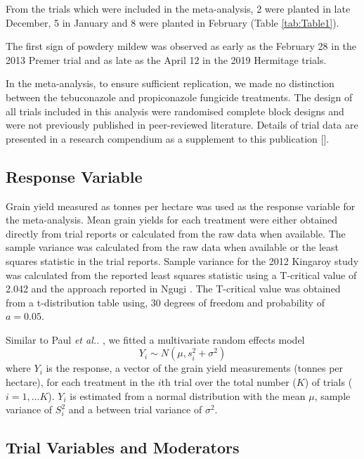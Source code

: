\documentclass[agronomy,article,submit,moreauthors,pdftex]{mdpi}
\begin{document}
From the trials which were included in the meta-analysis, 2 were planted in late December, 5 in January and 8 were planted in February (Table \ref{tab:Table1}).

The first sign of powdery mildew was observed as early as the February 28 in the 2013 Premer trial and as late as the April 12 in the 2019 Hermitage trials.

In the meta-analysis, to ensure sufficient replication, we made no distinction between the tebuconazole and propiconazole fungicide treatments.
The design of all trials included in this analysis were randomised complete block designs and were not previously published in peer-reviewed literature.
Details of trial data are presented in a research compendium as a supplement to this publication {[}{]}.

\hypertarget{response-variable}{%
\subsection{Response Variable}\label{response-variable}}

Grain yield measured as tonnes per hectare was used as the response variable for the meta-analysis.
Mean grain yields for each treatment were either obtained directly from trial reports or calculated from the raw data when available.
The sample variance was calculated from the raw data when available or the least squares statistic in the trial reports.
Sample variance for the 2012 Kingaroy study was calculated from the reported least squares statistic using a T-critical value of 2.042 and the approach reported in Ngugi \citeyearpar{Ngugi2011}.
The T-critical value was obtained from a t-distribution table using, 30 degrees of freedom and probability of \(a = 0.05\).

Similar to Paul \emph{et al..} \citeyearpar{Paul2007}, we fitted a multivariate random effects model
\begin{equation}
Y_i \sim N(\mu,s_i^2 + \sigma^2)
\end{equation}
where \(Y_i\) is the response, a vector of the grain yield measurements (tonnes per hectare), for each treatment in the \(i\)th trial over the total number (\(K\)) of trials (\(i = 1, ...K\)).
\(Y_i\) is estimated from a normal distribution with the mean \(\mu\), sample variance of \(S_i^2\) and a between trial variance of \(\sigma^2\).

\hypertarget{trial-variables-and-moderators}{%
\subsection{Trial Variables and Moderators}\label{trial-variables-and-moderators}}
\end{document}
